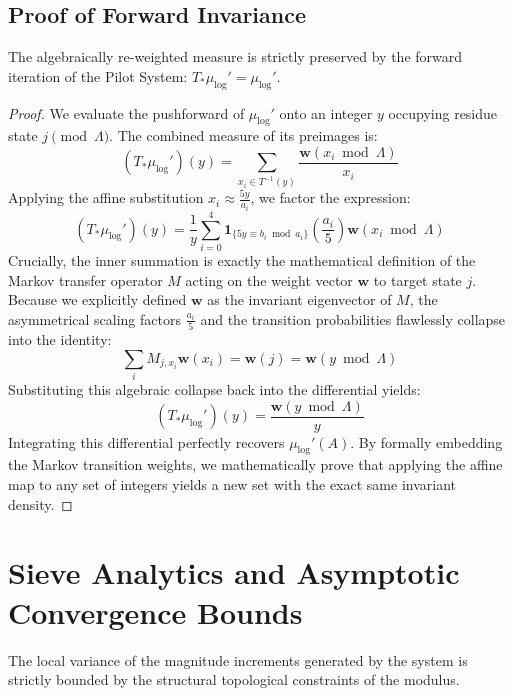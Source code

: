 \section{Proof of Forward Invariance}

\begin{theorem}
\leanok
The algebraically re-weighted measure is strictly preserved by the forward iteration of the Pilot System: $T_* \mu_{\log}' = \mu_{\log}'$.
\end{theorem}
\begin{proof}
We evaluate the pushforward of $\mu_{\log}'$ onto an integer $y$ occupying residue state $j \pmod{\Lambda}$. The combined measure of its preimages is:
$$ (T_* \mu_{\log}')(y) = \sum_{x_i \in T^{-1}(y)} \frac{\mathbf{w}(x_i \bmod \Lambda)}{x_i} $$
Applying the affine substitution $x_i \approx \frac{5y}{a_i}$, we factor the expression:
$$ (T_* \mu_{\log}')(y) = \frac{1}{y} \sum_{i=0}^4 \mathbf{1}_{\{5y \equiv b_i \bmod a_i\}} \left(\frac{a_i}{5}\right) \mathbf{w}(x_i \bmod \Lambda) $$
Crucially, the inner summation is exactly the mathematical definition of the Markov transfer operator $M$ acting on the weight vector $\mathbf{w}$ to target state $j$. Because we explicitly defined $\mathbf{w}$ as the invariant eigenvector of $M$, the asymmetrical scaling factors $\frac{a_i}{5}$ and the transition probabilities flawlessly collapse into the identity:
$$ \sum_{i} M_{j, x_i} \mathbf{w}(x_i) = \mathbf{w}(j) = \mathbf{w}(y \bmod \Lambda) $$
Substituting this algebraic collapse back into the differential yields:
$$ (T_* \mu_{\log}')(y) = \frac{\mathbf{w}(y \bmod \Lambda)}{y} $$
Integrating this differential perfectly recovers $\mu_{\log}'(A)$. By formally embedding the Markov transition weights, we mathematically prove that applying the affine map to any set of integers yields a new set with the exact same invariant density.
\end{proof}

\chapter{Sieve Analytics and Asymptotic Convergence Bounds}

\begin{lemma}
\leanok
The local variance of the magnitude increments generated by the system is strictly bounded by the structural topological constraints of the modulus.
\end{lemma}

